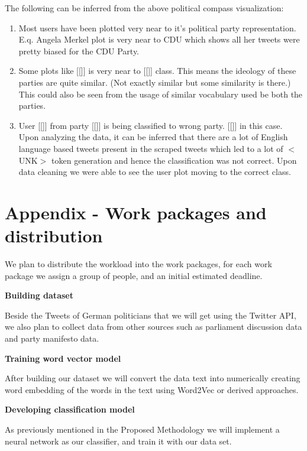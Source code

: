\documentclass[10pt, oneside]{article}
\begin{document}
\begin{multicols}{2}
The following can be inferred from the above political compass visualization:

\begin{enumerate}
	\item Most users have been plotted very near to it’s political party representation. E.q. Angela Merkel plot is very near to CDU which shows all her tweets were pretty biased for the CDU Party.
	\item Some plots like [[]] is very near to [[]] class. This means the ideology of these parties are quite similar. (Not exactly similar but some similarity is there.) This could also be seen from the usage of similar vocabulary used be both the parties.
	\item User [[]] from party [[]] is being classified to wrong party. [[]] in this case. Upon analyzing the data, it can be inferred that there are a lot of English language based tweets present in the scraped tweets which led to a lot of $<$UNK$>$ token generation and hence the classification was not correct. Upon data cleaning we were able to see the user plot moving to the correct class. 
\end{enumerate}


\end{multicols}
\newpage

\section{Appendix - Work packages and distribution}

We plan to distribute the workload into the work packages, for each work package we assign a group of people, and an initial estimated deadline.

\begin{flushleft}
\textbf{Building dataset}

Beside the Tweets of German politicians that we will get using the Twitter API, we also plan to collect data from other sources such as parliament discussion data and party manifesto data.
\end{flushleft}

\begin{flushleft}
\textbf{Training word vector model}

After building our dataset we will convert the data text into numerically creating word embedding of the words in the text using Word2Vec or derived approaches.
\end{flushleft}

\begin{flushleft}
\textbf{Developing classification model}

As previously mentioned in the Proposed Methodology we will implement a neural network as our classifier, and train it with our data set.
\end{flushleft}
\end{document}
